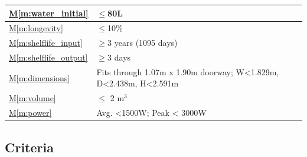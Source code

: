 \documentclass{../tex/report}
\newcommand{\mref}[1]{\hyperref[#1]{M\ref{#1}}}
\begin{document}
\begin{tabular}{|l|p{14.35cm}|}
    \mref{m:water_initial}          & $\le$80L                                                          \hfill \cite{dsfc-phase2}                               \\ \hline
    \mref{m:longevity}              & $\le$10\%                                                         \hfill \cite{applicantguide,dsfc-phase2}                \\ \hline
    \mref{m:shelflife_input}        & $\ge$3 years (1095 days)                                          \hfill \cite{applicantguide,dsfc-phase2}                \\ \hline
    \mref{m:shelflife_output}       & $\ge$3 days                                                       \hfill \cite{dsfc-phase2}                               \\ \hline
    \mref{m:dimensions}             & Fits through 1.07m x 1.90m doorway; W<1.829m, D<2.438m, H<2.591m  \hfill \cite{applicantguide,dsfc-phase2}                \\ \hline
    \mref{m:volume}                 & $\le$ 2 m${}^3$                                                   \hfill \cite{applicantguide,dsfc-phase2}                \\ \hline
    \mref{m:power}                  & Avg. <1500W; Peak < 3000W                                         \hfill \cite{applicantguide,dsfc-phase2}                \\ \hline
\end{tabular}
\vfill
{}

\subsection{Criteria}
\label{sec:criteria}
\end{document}
